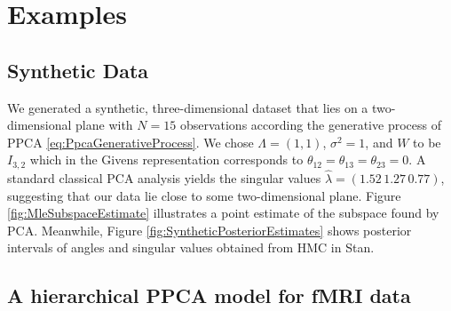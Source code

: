 \documentclass{article}
\begin{document}
\section{Examples}

\subsection{Synthetic Data}
We generated a synthetic, three-dimensional dataset that lies on a two-dimensional plane with $N =15$ observations according the generative process of PPCA \ref{eq:PpcaGenerativeProcess}. We chose $\Lambda = (1, 1)$, $\sigma^2 = 1$, and $W$ to be $I_{3,2}$ which in the Givens representation corresponds to $\theta_{12} = \theta_{13} = \theta_{23} = 0$. A standard classical PCA analysis yields the singular values $\hat{\lambda} = (1.52\, 1.27\, 0.77)$, suggesting that our data lie close to some two-dimensional plane. Figure \ref{fig:MleSubspaceEstimate} illustrates a point estimate of the subspace found by PCA. Meanwhile, Figure \ref{fig:SyntheticPosteriorEstimates} shows posterior intervals of angles and singular values obtained from HMC in Stan.

\subsection{A hierarchical PPCA model for fMRI data}
\end{document}
